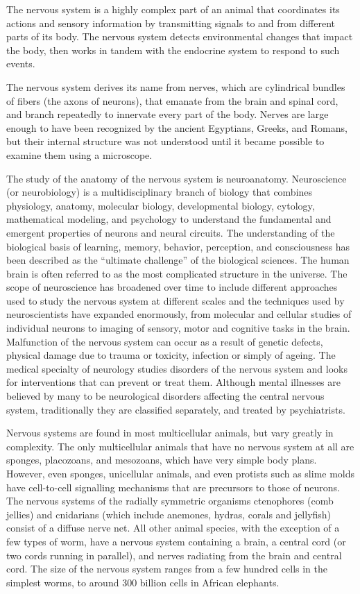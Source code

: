 The nervous system is a highly complex part of an animal that coordinates its actions and sensory information by transmitting signals to and from different parts of its body. The nervous system detects environmental changes that impact the body, then works in tandem with the endocrine system to respond to such events.

The nervous system derives its name from nerves, which are cylindrical bundles of fibers (the axons of neurons), that emanate from the brain and spinal cord, and branch repeatedly to innervate every part of the body. Nerves are large enough to have been recognized by the ancient Egyptians, Greeks, and Romans, but their internal structure was not understood until it became possible to examine them using a microscope.

The study of the anatomy of the nervous system is neuroanatomy. Neuroscience (or neurobiology) is a multidisciplinary branch of biology that combines physiology, anatomy, molecular biology, developmental biology, cytology, mathematical modeling, and psychology to understand the fundamental and emergent properties of neurons and neural circuits. The understanding of the biological basis of learning, memory, behavior, perception, and consciousness has been described as the ``ultimate challenge'' of the biological sciences. The human brain is often referred to as the most complicated structure in the universe. The scope of neuroscience has broadened over time to include different approaches used to study the nervous system at different scales and the techniques used by neuroscientists have expanded enormously, from molecular and cellular studies of individual neurons to imaging of sensory, motor and cognitive tasks in the brain. Malfunction of the nervous system can occur as a result of genetic defects, physical damage due to trauma or toxicity, infection or simply of ageing. The medical specialty of neurology studies disorders of the nervous system and looks for interventions that can prevent or treat them. Although mental illnesses are believed by many to be neurological disorders affecting the central nervous system, traditionally they are classified separately, and treated by psychiatrists.

Nervous systems are found in most multicellular animals, but vary greatly in complexity. The only multicellular animals that have no nervous system at all are sponges, placozoans, and mesozoans, which have very simple body plans. However, even sponges, unicellular animals, and even protists such as slime molds have cell-to-cell signalling mechanisms that are precursors to those of neurons. The nervous systems of the radially symmetric organisms ctenophores (comb jellies) and cnidarians (which include anemones, hydras, corals and jellyfish) consist of a diffuse nerve net. All other animal species, with the exception of a few types of worm, have a nervous system containing a brain, a central cord (or two cords running in parallel), and nerves radiating from the brain and central cord. The size of the nervous system ranges from a few hundred cells in the simplest worms, to around 300 billion cells in African elephants.

